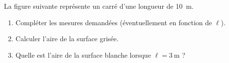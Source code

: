 
\begin{exercice}\label{exo2smath-0008}

    La figure suivante représente un carré d'une longueur de \SI{10}{\meter}.
\begin{center}

\end{center}

    \begin{enumerate}
        \item
            Compléter les mesures demandées (éventuellement en fonction de \( \ell\)).
        \item
            Calculer l'aire de la surface grisée.
        \item
            Quelle est l'aire de la surface blanche lorsque \( \ell=\SI{3}{\meter}\) ?
    \end{enumerate}


\end{exercice}
